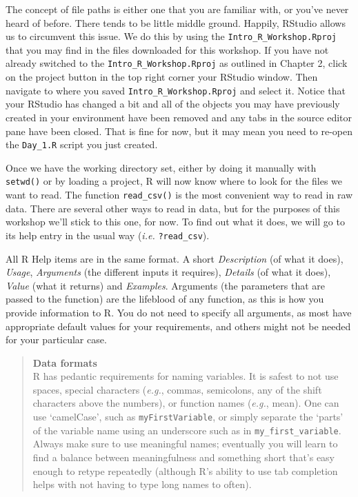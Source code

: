 \documentclass[]{book}
\theoremstyle{definition}
\theoremstyle{definition}
\theoremstyle{definition}
\theoremstyle{remark}
\begin{document}
The concept of file paths is either one that you are familiar with, or
you've never heard of before. There tends to be little middle ground.
Happily, RStudio allows us to circumvent this issue. We do this by using
the \texttt{Intro\_R\_Workshop.Rproj} that you may find in the files
downloaded for this workshop. If you have not already switched to the
\texttt{Intro\_R\_Workshop.Rproj} as outlined in Chapter 2, click on the
project button in the top right corner your RStudio window. Then
navigate to where you saved \texttt{Intro\_R\_Workshop.Rproj} and select
it. Notice that your RStudio has changed a bit and all of the objects
you may have previously created in your environment have been removed
and any tabs in the source editor pane have been closed. That is fine
for now, but it may mean you need to re-open the \texttt{Day\_1.R}
script you just created.

Once we have the working directory set, either by doing it manually with
\texttt{setwd()} or by loading a project, R will now know where to look
for the files we want to read. The function \texttt{read\_csv()} is the
most convenient way to read in raw data. There are several other ways to
read in data, but for the purposes of this workshop we'll stick to this
one, for now. To find out what it does, we will go to its help entry in
the usual way (\emph{i.e.} \texttt{?read\_csv}).

All R Help items are in the same format. A short \emph{Description} (of
what it does), \emph{Usage}, \emph{Arguments} (the different inputs it
requires), \emph{Details} (of what it does), \emph{Value} (what it
returns) and \emph{Examples}. Arguments (the parameters that are passed
to the function) are the lifeblood of any function, as this is how you
provide information to R. You do not need to specify all arguments, as
most have appropriate default values for your requirements, and others
might not be needed for your particular case.

\begin{quote}
\textbf{Data formats}\\
R has pedantic requirements for naming variables. It is safest to not
use spaces, special characters (\emph{e.g.}, commas, semicolons, any of
the shift characters above the numbers), or function names (\emph{e.g.},
mean). One can use `camelCase', such as \texttt{myFirstVariable}, or
simply separate the `parts' of the variable name using an underscore
such as in \texttt{my\_first\_variable}. Always make sure to use
meaningful names; eventually you will learn to find a balance between
meaningfulness and something short that's easy enough to retype
repeatedly (although R's ability to use tab completion helps with not
having to type long names to often).
\end{quote}
\end{document}
